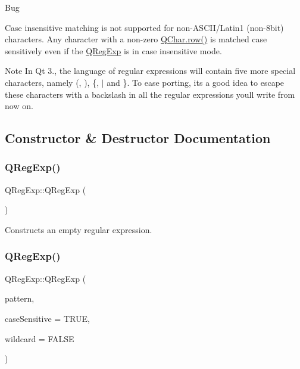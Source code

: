 \begin{DoxyRefDesc}{Bug}
\item[\mbox{\hyperlink{bug__bug000003}{Bug}}]Case insensitive matching is not supported for non-\/\+A\+S\+C\+I\+I/\+Latin1 (non-\/8bit) characters. Any character with a non-\/zero \mbox{\hyperlink{class_q_char_a8f987c65692f95eebc84bf687ea92aff}{Q\+Char.\+row()}} is matched case sensitively even if the \mbox{\hyperlink{class_q_reg_exp}{Q\+Reg\+Exp}} is in case insensitive mode.\end{DoxyRefDesc}


\begin{DoxyNote}{Note}
In Qt 3., the language of regular expressions will contain five more special characters, namely \textquotesingle{}(\textquotesingle{}, \textquotesingle{})\textquotesingle{}, \textquotesingle{}\{\textquotesingle{}, \textquotesingle{}$\vert$\textquotesingle{} and \textquotesingle{}\}\textquotesingle{}. To ease porting, it\textquotesingle{}s a good idea to escape these characters with a backslash in all the regular expressions you\textquotesingle{}ll write from now on. 
\end{DoxyNote}


\subsection{Constructor \& Destructor Documentation}
\mbox{\label{class_q_reg_exp_a65d0a33606138cfe702c629566415518}} 
\subsubsection{\texorpdfstring{QRegExp()}{QRegExp()}\hspace{0.1cm}{\footnotesize\ttfamily [1/3]}}
{\footnotesize\ttfamily Q\+Reg\+Exp\+::\+Q\+Reg\+Exp (\begin{DoxyParamCaption}{ }\end{DoxyParamCaption})}

Constructs an empty regular expression. \mbox{\label{class_q_reg_exp_a2706f7fb6279510e07e9285040c8758e}} 
\subsubsection{\texorpdfstring{QRegExp()}{QRegExp()}\hspace{0.1cm}{\footnotesize\ttfamily [2/3]}}
{\footnotesize\ttfamily Q\+Reg\+Exp\+::\+Q\+Reg\+Exp (\begin{DoxyParamCaption}\item[{const \mbox{\hyperlink{class_q_c_string}{Q\+C\+String}} \&}]{pattern,  }\item[{bool}]{case\+Sensitive = {\ttfamily TRUE},  }\item[{bool}]{wildcard = {\ttfamily FALSE} }\end{DoxyParamCaption})}

